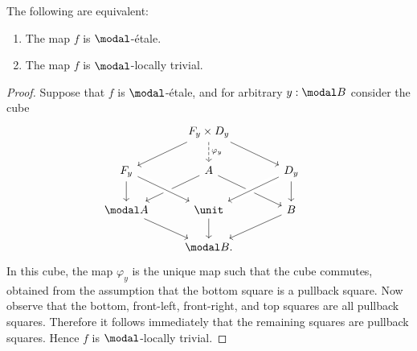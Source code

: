 \documentclass{msc}
\begin{document}
\begin{prp}\label{prp:locally_trivial}
  The following are equivalent:
  \begin{enumerate}
  \item The map $f$ is $\modal$-\'etale.
  \item The map $f$ is $\modal$-locally trivial.
  \end{enumerate}
\end{prp}

\begin{proof}
  Suppose that $f$ is $\modal$-\'etale, and for arbitrary $y:\modal B$ consider the cube
    \begin{equation*}
    \begin{tikzcd}
      & F_y\times D_y \arrow[dl] \arrow[d,dashed,"\varphi_y"] \arrow[dr] & \phantom{\modal A}\\
      F_y \arrow[d] & A \arrow[dl] \arrow[dr] & D_y \arrow[d] \arrow[dl,crossing over] \\
      \modal A \arrow[dr] & \unit \arrow[from=ul,crossing over] \arrow[d] & B \arrow[dl] \\
      & \modal B.
    \end{tikzcd}
  \end{equation*}
  In this cube, the map $\varphi_y$ is the unique map such that the cube commutes, obtained from the assumption that the bottom square is a pullback square. Now observe that the bottom, front-left, front-right, and top squares are all pullback squares. Therefore it follows immediately that the remaining squares are pullback squares. Hence $f$ is $\modal$-locally trivial.


\end{proof}
\end{document}
